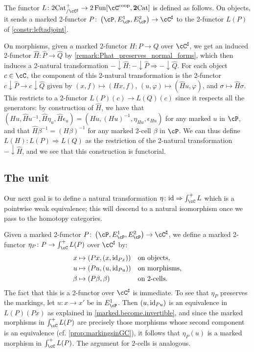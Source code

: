 \documentclass[11pt, dvipsnames]{amsart}
\begin{document}
 
\begin{constr}
    The functor $L\colon\mslicetwocat\to 2\Fun[\cC^\coop,\ttwocat]$ is defined as follows. On objects, it sends a marked 2-functor $P\colon\markedscat{\cP}\to\cC^\sharp$ to the 2-functor $L(P)$ of \cref{constr:leftadjoint}. 
    
    On morphisms, given a marked 2-functor $H\colon P\to Q$ over $\cC^\sharp$, we get an induced 2-functor $\widehat{H}\colon\widehat{P}\to\widehat{Q}$ by \cref{remark:Phat_preserves_normal_forms}, which then induces a 2-natural transformation $-\downarrow\widehat{H}\colon -\downarrow\widehat{P}\Rightarrow -\downarrow\widehat{Q}$. For each object $c\in\cC$, the component of this 2-natural transformation is the 2-functor $c\downarrow\widehat{P}\to c\downarrow\widehat{Q}$ given by $(x,f)\mapsto (Hx,f)$, $(u,\varphi)\mapsto (\widehat{H}u,\varphi)$, and $\sigma\mapsto \widehat{H}\sigma$. This restricts to a 2-functor $L(P)(c)\to L(Q)(c)$ since it respects all the generators: by construction of $\widehat{H}$, we have that $(Hu,\widehat{H}u^{-1}, \widehat{H}\eta_u,\widehat{H}\epsilon_u)=(Hu,(Hu)^{-1},\eta_{Hu},\epsilon_{Hu})$ for any marked $u$ in $\cP$, and that $\widehat{H}\beta^{-1}=(H\beta)^{-1}$ for any marked 2-cell $\beta$ in $\cP$. We can thus define $L(H)\colon L(P)\Rightarrow L(Q)$ as the restriction of the 2-natural transformation $-\downarrow\widehat{H}$, and we see that this construction is functorial.
\end{constr}


\subsection{The unit}

Our next goal is to define a natural transformation $\eta\colon \id\Rightarrow \int_\cC^+ L$ which is a pointwise weak equivalence; this will descend to a natural isomorphism once we pass to the homotopy categories. 

\begin{constr}\label{constr.unit}
    Given a marked 2-functor $P\colon\markedscat{\cP}\to\Csharp$, we define a marked 2-functor $\eta_P\colon P \to\int_\cC^+ L(P)$ over $\Csharp$ by: 
    \[
		\begin{aligned}
		x &\mapsto (Px, (x,\mathrm{id}_{Px})) && \text{on objects,}\\
		u &\mapsto (Pu, (u,\mathrm{id}_{Pu})) && \text{on morphisms,}\\
		\beta &\mapsto (P\beta, \beta) && \text{on $2$-cells.}
		\end{aligned}
	\] The fact that this is a 2-functor over $\Csharp$ is immediate. To see that $\eta_P$ preserves the markings,  let $u\colon x\to x'$ be in $E^1_\cP$. Then $(u,\mathrm{id}_{Pu})$ is an equivalence in $L(P)(Px)$ as explained in \cref{marked.become.invertible}, and since the marked morphisms in $\int_\cC^+ L(P)$ are precisely those morphisms whose second component is an equivalence (cf. \cref{prop:markingsinGC}), it follows that $\eta_P(u)$ is a marked morphism in $\int_\cC^+ L(P)$. The argument for $2$-cells is analogous.
\end{constr}
\end{document}
